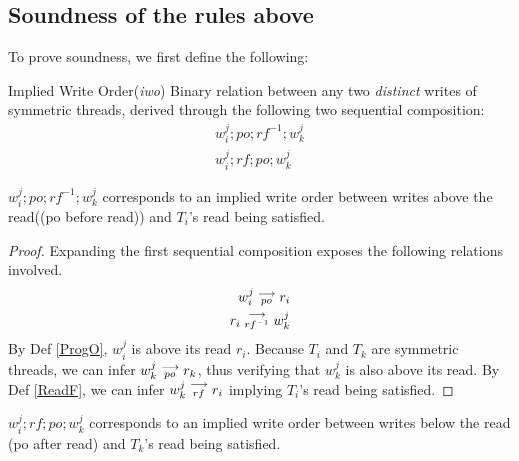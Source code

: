 \subsection{Soundness of the rules above}

    To prove soundness, we first define the following: 

    \begin{definition}{Implied Write Order(\emph{iwo})}
        \label{ImpliedW}
        Binary relation between any two \emph{distinct} writes of symmetric threads, derived through the following two sequential composition:  
        \begin{align*}
            w_i^j;po;rf^{-1};w_k^j \\
            w_i^j;rf;po;w_k^j 
        \end{align*}
    \end{definition}


    \begin{property}
        \label{Wabv}
        $w_i^j;po;rf^{-1};w_k^j$ corresponds to an implied write order between writes above the read((po before read)) and $T_i$'s read being satisfied. 
    \end{property}
    
    \begin{proof}
        Expanding the first sequential composition exposes the following relations involved. 
        \begin{align*}
            w_i^j\stackrel{\longrightarrow}{_{po}}r_i \\ 
            r_i\stackrel{\longrightarrow}{_{rf^{-1}}}w_k^j
        \end{align*}
        By Def \ref{ProgO}, $w_i^j$ is above its read $r_i$. Because $T_i$ and $T_k$ are symmetric threads, we can infer $w_k^j\stackrel{\longrightarrow}{_{po}}r_k$, thus verifying that $w_k^j$ is also above its read. 
        By Def \ref{ReadF}, we can infer $w_k^j\stackrel{\longrightarrow}{_{rf}}r_i$ implying $T_i$'s read being satisfied.   
    \end{proof}


    \begin{property}
        \label{Wbel}
        $w_i^j;rf;po;w_k^j$ corresponds to an implied write order between writes below the read (po after read) and $T_k$'s read being satisfied.
    \end{property}


